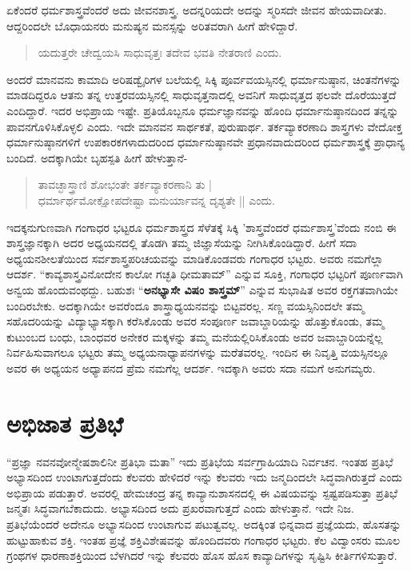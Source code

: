 ಏಕೆಂದರೆ ಧರ್ಮಶಾಸ್ತ್ರವೆಂದರೆ ಅದು ಜೀವನಶಾಸ್ತ್ರ. ಅದನ್ನರಿಯದೇ ಅದನ್ನು ಸ್ಮರಿಸದೇ ಜೀವನ ಹೇಯವಾದೀತು. ಆದ್ದರಿಂದಲೇ ಬೊಧಾಯನರು ಮನುಷ್ಯನ ಮನಸ್ಸನ್ನು ಅರಿತವರಾಗಿ ಹೀಗೆ ಹೇಳಿದ್ದಾರೆ.
\begin{verse}
ಯದುತ್ತರೇ ಚೇದ್ವಯಸಿ ಸಾಧುವೃತ್ತಃ ತದೇವ ಭವತಿ ನೇತರಾಣಿ ಎಂದು.
\end{verse}
ಅಂದರೆ ಮಾನವನು ಕಾಮಾದಿ ಅರಿಷಡ್ವೈರಿಗಳ ಬಲೆಯಲ್ಲಿ ಸಿಕ್ಕಿ ಪೂರ್ವವಯಸ್ಸಿನಲ್ಲಿ ಧರ್ಮಾನುಷ್ಠಾನ, ಚಿಂತನೆಗಳನ್ನು ಮಾಡದಿದ್ದರೂ ಆತನು ತನ್ನ ಉತ್ತರವಯಸ್ಸಿನಲ್ಲಿ ಸಾಧುವೃತ್ತನಾದಲ್ಲಿ ಅವನಿಗೆ ಸಾಧುವೃತ್ತದ ಫಲವೇ ದೊರೆಯುತ್ತದೆ ಎಂದಿದ್ದಾರೆ. ಇದರ ಅಭಿಪ್ರಾಯ ಇಷ್ಟೇ. ಪ್ರತಿಯೊಬ್ಬನೂ ಧರ್ಮಜ್ಞಾನವನ್ನು ಹೊಂದಿ ಧರ್ಮಾನುಷ್ಠಾನದಿಂದ ತನ್ನನ್ನು ಪಾವನಗೊಳಿಸಿಕೊಳ್ಳಲಿ ಎಂದು. ಇದೇ ಮಾನವನ ಸಾರ್ಥಕತೆ, ಪುರುಷಾರ್ಥ. ತರ್ಕವ್ಯಾಕರಣಾದಿ ಶಾಸ್ತ್ರಗಳು ವೇದೋಕ್ತ ಧರ್ಮಾನುಷ್ಠಾನಗಳಿಗೆ ಉಪಕಾರಕಗಳಾದುದರಿಂದ ಧರ್ಮಾನುಷ್ಠಾನವೇ ಪ್ರಧಾನವಾದುದರಿಂದ ಧರ್ಮಶಾಸ್ತ್ರಕ್ಕೆ ಪ್ರಾಧಾನ್ಯ ಬಂದಿದೆ. ಅದಕ್ಕಾಗಿಯೇ ಬೃಹಸ್ಪತಿ ಹೀಗೆ ಹೇಳುತ್ತಾನೆ-
\begin{verse}
ತಾವಚ್ಛಾಸ್ತ್ರಾಣಿ ಶೋಭಂತೇ ತರ್ಕವ್ಯಾಕರಣಾನಿ ತು |\\
ಧರ್ಮಾರ್ಥಮೋಕ್ಷೋಪದೇಷ್ಟಾ ಮನುರ್ಯಾವನ್ನ ದೃಶ್ಯತೇ || ಎಂದು.
\end{verse}
ಇದಕ್ಕನುಗುಣವಾಗಿ ಗಂಗಾಧರ ಭಟ್ಟರೂ ಧರ್ಮಶಾಸ್ತ್ರದ ಸೆಳೆತಕ್ಕೆ ಸಿಕ್ಕಿ ’ಶಾಸ್ತ್ರವೆಂದರೆ ಧರ್ಮಶಾಸ್ತ್ರ’ವೆಂದು ನಂಬಿ ಈ ಶಾಸ್ತ್ರಜ್ಞಾನಕ್ಕಾಗಿ ಅದರ ಅಧ್ಯಯನದಲ್ಲಿ ತೊಡಗಿ ತಮ್ಮ ಜಿಜ್ಞಾಸೆಯನ್ನು ನೀಗಿಸಿಕೊಂಡಿದ್ದಾರೆ. ಹೀಗೆ ಸದಾ ಅಧ್ಯಯನಶೀಲತೆಯಿಂದ ಸರ್ವಶಾಸ್ತ್ರಪರಿಚಯವನ್ನು ಮಾಡಿಕೊಂಡವರು ಗಂಗಾಧರ ಭಟ್ಟರು. ಅವರು ನಮಗೆಲ್ಲಾ ಆದರ್ಶ. “ಕಾವ್ಯಶಾಸ್ತ್ರವಿನೋದೇನ ಕಾಲೋ ಗಚ್ಛತಿ ಧೀಮತಾಮ್” ಎನ್ನುವ ಸೂಕ್ತಿ, ಗಂಗಾಧರ ಭಟ್ಟರಿಗೆ ಪೂರ್ಣವಾಗಿ ಅನ್ವಯ ಹೊಂದುವಂಥದ್ದು. ಬಹುಶಃ “\textbf{ಅನಭ್ಯಾಸೇ ವಿಷಂ ಶಾಸ್ತ್ರಮ್}” ಎನ್ನುವ ಸುಭಾಷಿತ ಅವರ ರಕ್ತಗತವಾಗಿಯೇ ಬಂದಿರಬೇಕು. ಅದಕ್ಕಾಗಿಯೇ ಅವರೆಂದೂ ಶಾಸ್ತ್ರಾಧ್ಯಯನವನ್ನು ಬಿಟ್ಟವರಲ್ಲ. ಸಣ್ಣ ವಯಸ್ಸಿನಿಂದಲೇ ತಮ್ಮ ಸಹೊದರಿಯನ್ನು ವಿದ್ಯಾಭ್ಯಾಸಕ್ಕಾಗಿ ಕರೆಸಿಕೊಂಡು ಅವರ ಸಂಪೂರ್ಣ ಜವಾಬ್ದಾರಿಯನ್ನು ಹೊತ್ತುಕೊಂಡು, ತಮ್ಮ ಕುಟುಂಬದ ಬಂಧು, ಬಾಂಧವರ ಅನೇಕರ ಮಕ್ಕಳನ್ನು ತಮ್ಮ ಮನೆಯಲ್ಲಿರಿಸಿಕೊಂಡು ಅವರ ಜವಾಬ್ದಾರಿಯನ್ನೆಲ್ಲ ನಿರ್ವಹಿಸುವಾಗಲೂ ಭಟ್ಟರು ತಮ್ಮ ಅಧ್ಯಯನಾಧ್ಯಾಪನಗಳನ್ನು ಮರೆತವರಲ್ಲ. ಇಂದಿನ ಈ ನಿವೃತ್ತಿ ವಯಸ್ಸಿನಲ್ಲೂ ಅವರ ಈ ಅಧ್ಯಯನ ಅಧ್ಯಾಪನದ ಪ್ರೆಮ ನಮಗೆಲ್ಲ ಆದರ್ಶ. ಇದಕ್ಕಾಗಿ ಅವರು ಸದಾ ನಮಗೆ ಅನುಗಮ್ಯರು.

\section*{ಅಭಿಜಾತ ಪ್ರತಿಭೆ}  

“ಪ್ರಜ್ಞಾ ನವನವೋನ್ಮೇಷಶಾಲಿನೀ ಪ್ರತಿಭಾ ಮತಾ” ಇದು ಪ್ರತಿಭೆಯ ಸರ್ವಗ್ರಾಹಿಯಾದಿ ನಿರ್ವಚನ. ಇಂತಹ ಪ್ರತಿಭೆ ಅಭ್ಯಾಸದಿಂದ ಉಂಟಾಗುತ್ತದೆಂದು ಕೆಲವರು ಹೇಳಿದರೆ ಇನ್ನು ಕೆಲವರು ಇದು ಜನ್ಮದಿಂದಲೇ ಸಿದ್ಧವಾಗಿರುತ್ತದೆ ಎಂದು ಅಭಿಪ್ರಾಯ ಪಡುತ್ತಾರೆ. ಅವರಲ್ಲಿ ಹೇಮಚಂದ್ರ ತನ್ನ ಕಾವ್ಯಾನುಶಾಸನದಲ್ಲಿ ಈ ವಿಷಯವನ್ನು ಸ್ಪಷ್ಟಪಡಿಸುತ್ತಾ ಪ್ರತಿಭೆ ಜನ್ಮತಃ ಸಿದ್ಧವಾಗಬೆಕಾದುದು. ಅಭ್ಯಾಸದಿಂದ ಅದು ಪ್ರಖರವಾಗುತ್ತದೆ ಎಂದು ಹೇಳುತ್ತಾನೆ. ಇದೇ ನಿಜ. ಪ್ರತಿಭೆಯೆಂದರೆ ಅದೇನೂ ಅಭ್ಯಾಸದಿಂದ ಉಂಟಾಗುವ ಪಟುತ್ವವಲ್ಲ. ಅದಕ್ಕಿಂತ ಭಿನ್ನವಾದ ಪ್ರಜ್ಞೆಯದು, ಹೊಸತನ್ನು ಹುಟ್ಟುಹಾಕುವ ಶಕ್ತಿ. ಇಂತಹ ಪ್ರಜ್ಞೆ ಶಕ್ತಿವಿಶೇಷವನ್ನು ಹೊಂದಿದವರು ಗಂಗಾಧರ ಭಟ್ಟರು. ಕೆಲ ವಿದ್ವಾಂಸರು ಮೂಲ ಗ್ರಂಥಗಳ ಧಾರಣಾಶಕ್ತಿಯಿಂದ ಬೆಳಗಿದರೆ ಇನ್ನು ಕೆಲವರು ಹೊಸ ಹೊಸ ಕಾವ್ಯಾದಿಗಳನ್ನು ಸೃಷ್ಟಿಸಿ ಕೀರ್ತಿಗಳಿಸುತ್ತಾರೆ. 

